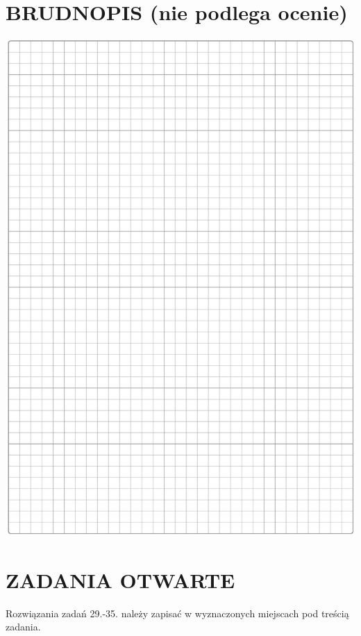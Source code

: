 \documentclass[10pt]{article}
\begin{document}
\section*{BRUDNOPIS (nie podlega ocenie)}
\begin{center}
\includegraphics[max width=\textwidth]{2024_11_21_cdea326d19d0c2132b88g-11}
\end{center}

\section*{ZADANIA OTWARTE}
Rozwiązania zadań 29.-35. należy zapisać w wyznaczonych miejscach pod treścią zadania.
\end{document}
